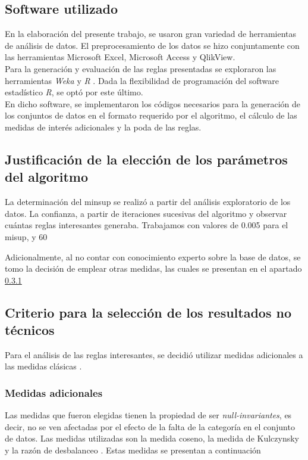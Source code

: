 \documentclass[]{article}
\begin{document}
	
	
	\subsection{Software utilizado}
	En la elaboración del presente trabajo, se usaron gran variedad de herramientas de análisis de datos. El preprocesamiento de los datos se hizo conjuntamente con las herramientas Microsoft Excel, Microsoft Access y QlikView.\\
	
	Para la generación y evaluación de las reglas presentadas se exploraron las herramientas \textit{Weka} \cite{Weka1} y \textit{R} \cite{RCran}. Dada la flexibilidad de programación del software estadístico \textit{R}, se optó por este último.\\
	
	En dicho software, se implementaron los códigos necesarios para la generación de los conjuntos de datos en el formato requerido por el algoritmo, el cálculo de las medidas de interés adicionales y la poda de las reglas.
	
	\subsection{Justificación de la elección de los parámetros del algoritmo}
	La determinación del minsup se realizó a partir del análisis exploratorio de los datos. La confianza, a partir de iteraciones sucesivas del algoritmo y observar cuántas reglas interesantes generaba. Trabajamos con valores de 0.005 para el misup, y 60%
	
	Adicionalmente, al no contar con conocimiento experto sobre la base de datos, se tomo la decisión de emplear otras medidas, las cuales se presentan en el apartado \ref{Medidas} 
	
	\subsection{Criterio para la selección de los resultados no técnicos}
	
	Para el análisis de las reglas interesantes, se decidió utilizar medidas adicionales a las medidas clásicas \cite{Tan:2005:IDM:1095618}.
	
	\subsubsection{Medidas adicionales} \label{Medidas}
	Las medidas que fueron elegidas tienen la propiedad de ser \textit{null-invariantes}, es decir, no se ven afectadas por el efecto de la falta de la categoría en el conjunto de datos. Las medidas utilizadas son la medida coseno, la medida de Kulczynsky y la razón de desbalanceo \cite{Hall:2009:WDM:1656274.1656278}. Estas medidas se presentan a continuación\\
	
\end{document}
